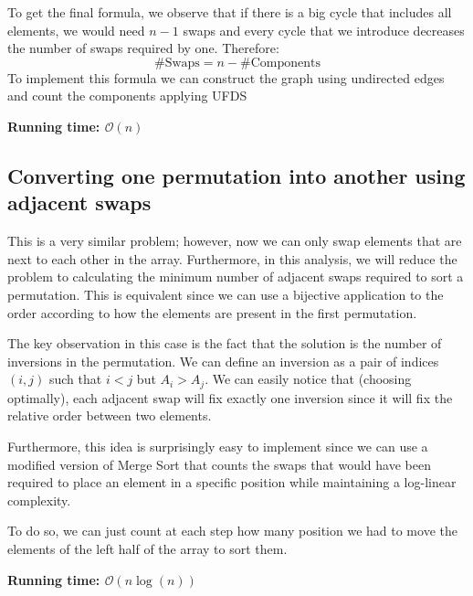 To get the final formula, we observe that if there is a big cycle
that includes all elements, we would need $n-1$ swaps and 
every cycle that we introduce decreases the number of swaps 
required by one.
Therefore:
\[
		\text{\# Swaps} = n- \text{\# Components}
\]
To implement this formula we can construct the graph using undirected
edges and count the components applying UFDS

\noindent \textbf{\boldmath Running time: $\mathcal{O}(n)$}

\subsection{Converting one permutation into another using adjacent swaps}
This is a very similar problem; however, now we can only swap elements
that are next to each other in the array. Furthermore, in this analysis,
we will reduce the problem to calculating the minimum number of adjacent
swaps required to sort a permutation. This is equivalent since we can use
a bijective application to  the order according to how the
elements are present in the first permutation.

The key observation in this case is the fact that the solution is the 
number of inversions in the permutation. We can define an inversion as
a pair of indices $(i,j)$ such that $i<j$ but $A_i > A_j$. We can easily
notice that (choosing optimally), each adjacent swap will fix exactly one 
inversion since it will fix the relative order between two elements.

Furthermore, this idea is surprisingly easy to implement since we can 
use a modified version of Merge Sort that counts the swaps that would
have been required to place an element in a specific position while
maintaining a log-linear complexity.

To do so, we can just count at each step how many position we had to move
the elements of the left half of the array to sort them.

\noindent \textbf{\boldmath Running time: $\mathcal{O}(n\log(n))$}









